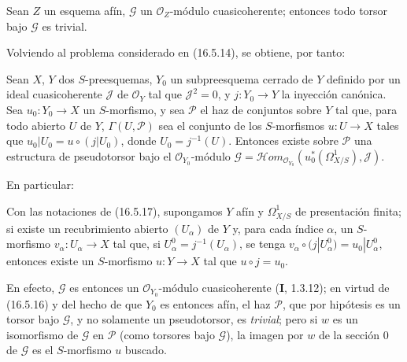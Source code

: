 \begin{proposition}[16.5.16]
\label{IV.16.5.16}
Sean $Z$ un esquema afín, $\mathscr{G}$ un $\mathcal{O}_Z$-módulo
cuasicoherente; entonces todo torsor bajo $\mathscr{G}$ es trivial.
\end{proposition}

Volviendo al problema considerado en (16.5.14), se obtiene, por tanto:

\begin{proposition}[16.5.17]
\label{IV.16.5.17}
Sean $X$, $Y$ dos $S$-preesquemas, $Y_0$ un subpreesquema cerrado de $Y$
definido por un ideal cuasicoherente $\mathscr{J}$ de $\mathcal{O}_Y$ tal que
$\mathscr{J}^2=0$, y $j:Y_0\to Y$ la inyección canónica. Sea
$u_0:Y_0\to X$ un $S$-morfismo, y sea $\mathscr{P}$ el haz de conjuntos sobre
$Y$ tal que, para todo abierto $U$ de $Y$, $\Gamma(U,\mathscr{P})$ sea
el conjunto de los $S$-morfismos $u:U\to X$ tales que
$u_0|U_0=u\circ(j|U_0)$, donde $U_0=j^{-1}(U)$. Entonces existe sobre
$\mathscr{P}$ una estructura de pseudotorsor bajo el
$\mathcal{O}_{Y_0}$-módulo
$\mathscr{G}=\mathscr{H}om_{\mathcal{O}_{Y_0}}(u_0^*(\varOmega_{X/S}^1),\mathscr{J})$.
\end{proposition}

En particular:

\begin{corollary}[16.5.18]
\label{IV.16.5.18}
Con las notaciones de \textup{(16.5.17)}, supongamos $Y$ afín y $\varOmega_{X/S}^1$ de
presentación finita; si existe un recubrimiento abierto $(U_\alpha)$ de $Y$
y, para cada índice $\alpha$, un $S$-morfismo $v_\alpha:U_\alpha\to X$
tal que, si $U_\alpha^0=j^{-1}(U_\alpha)$, se tenga
$v_\alpha\circ(j|U_\alpha^0)=u_0|U_\alpha^0$, entonces existe un
$S$-morfismo $u:Y\to X$ tal que $u\circ j=u_0$.
\end{corollary}

En efecto, $\mathscr{G}$ es entonces un $\mathcal{O}_{Y_0}$-módulo
cuasicoherente (\textbf I, 1.3.12); en virtud de (16.5.16) y del hecho de que $Y_0$ es
entonces afín, el haz $\mathscr{P}$, que por hipótesis es un torsor bajo
$\mathscr{G}$, y no solamente un pseudotorsor, es \emph{trivial}; pero si
$w$ es un isomorfismo de $\mathscr{G}$ en $\mathscr{P}$ (como
torsores bajo $\mathscr{G}$), la imagen por $w$ de la sección 0 de
$\mathscr{G}$ es el $S$-morfismo $u$ buscado.
